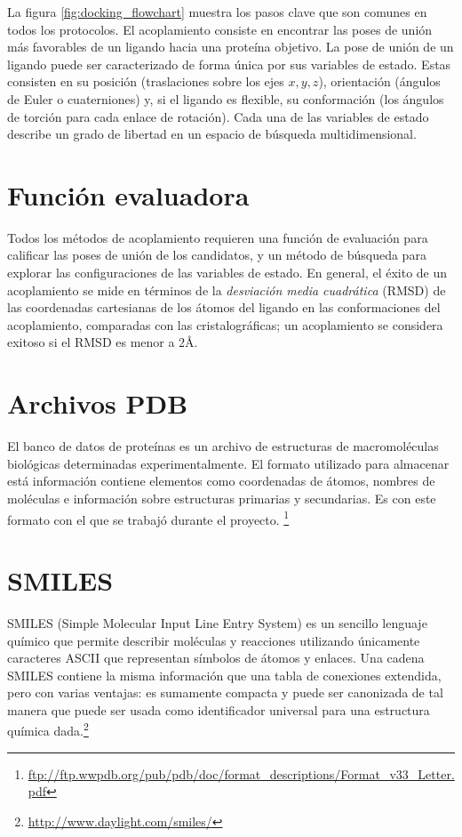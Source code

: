 La figura \ref{fig:docking_flowchart} muestra los pasos clave que son comunes en
todos los protocolos. El acoplamiento consiste en encontrar las poses de unión
más favorables de un ligando hacia una proteína objetivo. La
pose de unión de un ligando puede ser caracterizado de forma única por sus
variables de estado. Estas consisten en su posición (traslaciones sobre los ejes
$x, y, z$), orientación (ángulos de Euler o cuaterniones) y, si el ligando es
flexible, su conformación (los ángulos de torción para cada enlace de
rotación). Cada una de las variables de estado describe un grado de libertad en
un espacio de búsqueda multidimensional.

\section{Función evaluadora}
Todos los métodos de acoplamiento requieren una función de evaluación
para calificar las poses de unión de los candidatos, y un método
de búsqueda para explorar las configuraciones de las variables de
estado. En general, el éxito de un acoplamiento se mide en términos de
la \textit{desviación media cuadrática} (RMSD) de las coordenadas
cartesianas de los átomos del ligando en las conformaciones del
acoplamiento, comparadas con las cristalográficas; un acoplamiento se
considera exitoso si el RMSD es menor a 2\AA.

\section{Archivos PDB}
El banco de datos de proteínas es un archivo de estructuras de macromoléculas
biológicas determinadas experimentalmente. El formato utilizado para almacenar
está información contiene elementos como coordenadas de átomos, nombres de
moléculas e información sobre estructuras primarias y secundarias. Es con este
formato con el que se trabajó durante el proyecto.
\footnote{\url{ftp://ftp.wwpdb.org/pub/pdb/doc/format_descriptions/Format_v33_Letter.pdf}}

\section{SMILES}
SMILES (Simple Molecular Input Line Entry System) es un sencillo lenguaje
químico que permite describir moléculas y reacciones utilizando únicamente
caracteres ASCII que representan símbolos de átomos y enlaces. Una cadena SMILES
contiene la misma información que una tabla de conexiones extendida, pero con
varias ventajas: es sumamente compacta y puede ser canonizada de tal manera
que puede ser usada como identificador universal para una estructura química
dada.\footnote{\url{http://www.daylight.com/smiles/}}
